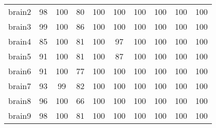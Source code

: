 \begin{adjustbox}{width=\textwidth}
\begin{tabular}{|l|ccc|ccc|ccc|}
	brain2                                                     & 98                   & 100                  & 80                    & 100                           & 100                          & 100                           & 100                             & 100                             & 100                              \\
	brain3                                                     & 99                   & 100                  & 86                    & 100                           & 100                          & 100                           & 100                             & 100                             & 100                              \\
	brain4                                                     & 85                   & 100                  & 81                    & 100                           & 97                           & 100                           & 100                             & 100                             & 100                              \\
	brain5                                                     & 91                   & 100                  & 81                    & 100                           & 87                           & 100                           & 100                             & 100                             & 100                              \\
	brain6                                                     & 91                   & 100                  & 77                    & 100                           & 100                          & 100                           & 100                             & 100                             & 100                              \\
	brain7                                                     & 93                   & 99                   & 82                    & 100                           & 100                          & 100                           & 100                             & 100                             & 100                              \\
	brain8                                                     & 96                   & 100                  & 66                    & 100                           & 100                          & 100                           & 100                             & 100                             & 100                              \\
	brain9                                                     & 98                   & 100                  & 81                    & 100                           & 100                          & 100                           & 100                             & 100                             & 100                              \\

\end{tabular}
\end{adjustbox}
